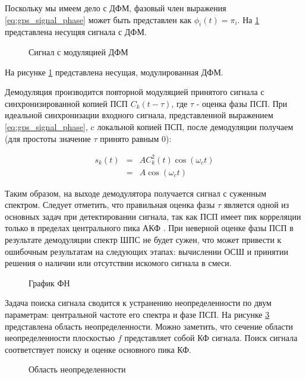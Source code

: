 Поскольку мы имеем дело с ДФМ, фазовый член выражения \ref{eq:gps_signal_phase} может быть представлен как
${\phi_{i}(t) = \pi_{i}}$. На \ref{pic:sec1_bpsk} представлена несущяя сигнала с ДФМ.

\begin{figure}[ht]
\center{}
\caption{Сигнал с модуляцией ДФМ}
\label{pic:sec1_bpsk}
\end{figure}
На рисунке \ref{pic:sec1_bpsk} представлена несущая, модулированная ДФМ.

Демодуляция производится повторной модуляцией принятого сигнала с синхронизированной копией ПСП ${C_k(t - \tau)}$, где
${\tau}$ - оценка фазы ПСП. При идеальной синхронизации входного сигнала, представленной выражением \ref{eq:gps_signal_phase},
c локальной копией ПСП, после демодуляции получаем (для простоты значение ${\tau}$ принято равным 0):
\begin{center}
\begin{eqnarray}
	\label{eq:gps_signal_modulated}
	s_k(t) & = & A C^2_k(t)\cos(\omega_{c}t) \nonumber \\
	& = & A \cos(\omega_{c}t)
\end{eqnarray}
\end{center}
Таким образом, на выходе демодулятора получается сигнал с суженным спектром. Следует отметить, что правильная оценка фазы ${\tau}$
является одной из основных задач при детектировании сигнала, так как ПСП имеет пик корреляции только в пределах центрального пика
АКФ \cite{gold-ieee}. При неверной оценке фазы ПСП в результате демодуляции спектр
ШПС не будет сужен, что может привести к ошибочным результатам на следующих этапах: вычислении ОСШ и принятии решения
о наличии или отсутствии искомого сигнала в смеси. 

\begin{figure}[H]
\center{}
\caption{График ФН}
\label{pic:corr_peak}
\end{figure}

Задача поиска сигнала сводится к устранению неопределенности по двум параметрам: центральной частоте его спектра
и фазе ПСП. На рисунке \ref{pic:ambiguity_region} представлена область неопределенности. Можно заметить, что сечение
области неопределенности плоскостью ${f}$ представляет собой КФ сигнала. Поиск сигнала соответствует поиску и
оценке основного пика КФ.

\begin{figure}[H]
\center{}
\caption{Область неопределенности}
\label{pic:ambiguity_region}
\end{figure}

